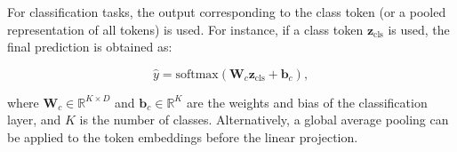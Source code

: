 For classification tasks, the output corresponding to the class token (or a pooled representation of all tokens) is used. For instance, if a class token \(\mathbf{z}_{\text{cls}}\) is used, the final prediction is obtained as:

\begin{equation}
\hat{y} = \text{softmax}\left(\mathbf{W}_c \mathbf{z}_{\text{cls}} + \mathbf{b}_c\right),
\end{equation}

where \(\mathbf{W}_c \in \mathbb{R}^{K \times D}\) and \(\mathbf{b}_c \in \mathbb{R}^{K}\) are the weights and bias of the classification layer, and \(K\) is the number of classes. Alternatively, a global average pooling can be applied to the token embeddings before the linear projection.


